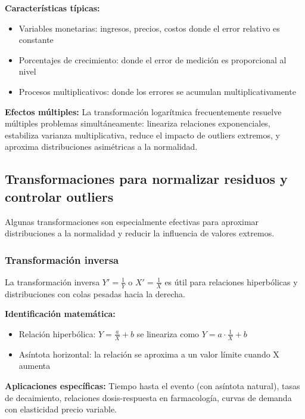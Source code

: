 \documentclass[
  letterpaper,
  DIV=11,
  numbers=noendperiod]{scrreprt}
\providecommand{\tightlist}{%
  \setlength{\itemsep}{0pt}\setlength{\parskip}{0pt}}
\begin{document}
\textbf{Características típicas:}

\begin{itemize}
\tightlist
\item
  Variables monetarias: ingresos, precios, costos donde el error
  relativo es constante
\item
  Porcentajes de crecimiento: donde el error de medición es proporcional
  al nivel
\item
  Procesos multiplicativos: donde los errores se acumulan
  multiplicativamente
\end{itemize}

\textbf{Efectos múltiples:} La transformación logarítmica frecuentemente
resuelve múltiples problemas simultáneamente: lineariza relaciones
exponenciales, estabiliza varianza multiplicativa, reduce el impacto de
outliers extremos, y aproxima distribuciones asimétricas a la
normalidad.

\subsection{Transformaciones para normalizar residuos y controlar
outliers}\label{transformaciones-para-normalizar-residuos-y-controlar-outliers}

Algunas transformaciones son especialmente efectivas para aproximar
distribuciones a la normalidad y reducir la influencia de valores
extremos.

\subsubsection{Transformación inversa}\label{transformaciuxf3n-inversa}

La transformación inversa \(Y' = \frac{1}{Y}\) o \(X' = \frac{1}{X}\) es
útil para relaciones hiperbólicas y distribuciones con colas pesadas
hacia la derecha.

\textbf{Identificación matemática:}

\begin{itemize}
\tightlist
\item
  Relación hiperbólica: \(Y = \frac{a}{X} + b\) se lineariza como
  \(Y = a \cdot \frac{1}{X} + b\)
\item
  Asíntota horizontal: la relación se aproxima a un valor límite cuando
  X aumenta
\end{itemize}

\textbf{Aplicaciones específicas:} Tiempo hasta el evento (con asíntota
natural), tasas de decaimiento, relaciones dosis-respuesta en
farmacología, curvas de demanda con elasticidad precio variable.
\end{document}
